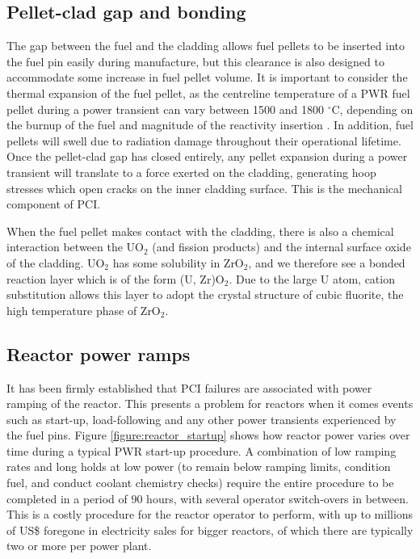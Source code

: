 \subsection{Pellet-clad gap and bonding}

The gap between the fuel and the cladding allows fuel pellets to be inserted into the fuel pin easily during manufacture, but this clearance is also designed to accommodate some increase in fuel pellet volume. It is important to consider the thermal expansion of the fuel pellet, as the centreline temperature of a PWR fuel pellet during a power transient can vary between 1500 and 1800 $^{\circ}$C, depending on the burnup of the fuel and magnitude of the reactivity insertion \cite{Bagger1994}. In addition, fuel pellets will swell due to radiation damage throughout their operational lifetime. Once the pellet-clad gap has closed entirely, any pellet expansion during a power transient will translate to a force exerted on the cladding, generating hoop stresses which open cracks on the inner cladding surface. This is the mechanical component of PCI.

When the fuel pellet makes contact with the cladding, there is also a chemical interaction between the UO$_{2}$ (and fission products) and the internal surface oxide of the cladding. UO$_{2}$ has some solubility in ZrO$_{2}$, and we therefore see a bonded reaction layer which is of the form (U, Zr)O$_{2}$.  Due to the large U atom, cation substitution allows this layer to adopt the crystal structure of cubic fluorite, the high temperature phase of ZrO$_{2}$.

\subsection{Reactor power ramps}

It has been firmly established that PCI failures are associated with power ramping of the reactor. This presents a problem for reactors when it comes events such as start-up, load-following and any other power transients experienced by the fuel pins. Figure \ref{figure:reactor_startup} shows how reactor power varies over time during a typical PWR start-up procedure. A combination of low ramping rates and long holds at low power (to remain below ramping limits, condition fuel, and conduct coolant chemistry checks) require the entire procedure to be completed in a period of 90 hours, with several operator switch-overs in between. This is a costly procedure for the reactor operator to perform, with up to millions of US\$ foregone in electricity sales for bigger reactors, of which there are typically two or more per power plant. 

